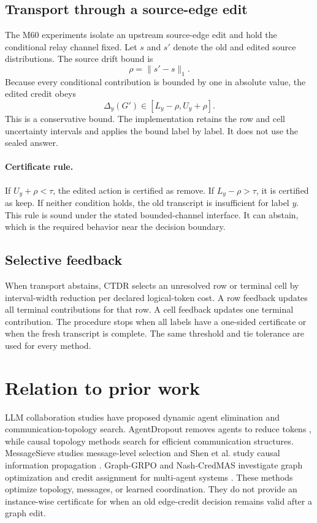 \documentclass[11pt]{article}
\newcommand{\ctdr}{\textsc{CTDR}}
\begin{document}
\subsection{Transport through a source-edge edit}
The M60 experiments isolate an upstream source-edge edit and hold the conditional relay channel fixed. Let $s$ and $s'$ denote the old and edited source distributions. The source drift bound is
\begin{equation}
\rho=\lVert s'-s\rVert_1.
\end{equation}
Because every conditional contribution is bounded by one in absolute value, the edited credit obeys
\begin{equation}
\Delta_y(G')\in[L_y-\rho, U_y+\rho].
\end{equation}
This is a conservative bound. The implementation retains the row and cell uncertainty intervals and applies the bound label by label. It does not use the sealed answer.

\paragraph{Certificate rule.}
If $U_y+\rho<\tau$, the edited action is certified as remove. If $L_y-\rho>\tau$, it is certified as keep. If neither condition holds, the old transcript is insufficient for label $y$. This rule is sound under the stated bounded-channel interface. It can abstain, which is the required behavior near the decision boundary.

\subsection{Selective feedback}
When transport abstains, \ctdr{} selects an unresolved row or terminal cell by interval-width reduction per declared logical-token cost. A row feedback updates all terminal contributions for that row. A cell feedback updates one terminal contribution. The procedure stops when all labels have a one-sided certificate or when the fresh transcript is complete. The same threshold and tie tolerance are used for every method.

\section{Relation to prior work}
LLM collaboration studies have proposed dynamic agent elimination and communication-topology search. AgentDropout removes agents to reduce tokens \citep{agentdropout}, while causal topology methods search for efficient communication structures. MessageSieve studies message-level selection and Shen et al. study causal information propagation \citep{messagesieve,eib}. Graph-GRPO and Nash-CredMAS investigate graph optimization and credit assignment for multi-agent systems \citep{graphgrpo,nashcredmas}. These methods optimize topology, messages, or learned coordination. They do not provide an instance-wise certificate for when an old edge-credit decision remains valid after a graph edit.
\end{document}
